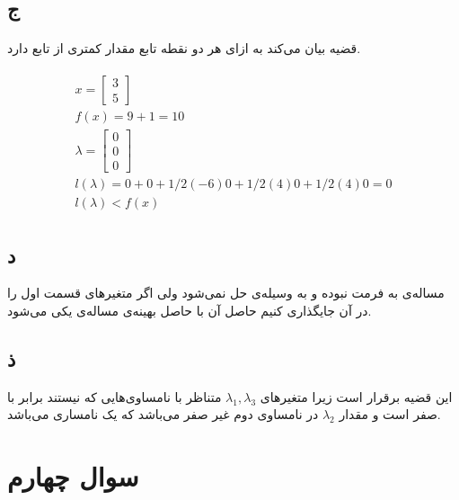 \documentclass[paper=a4, fontsize=11pt]{article}
\numberwithin{equation}{section} %
\numberwithin{figure}{section} %
\numberwithin{table}{section} %
\begin{document}
\subsection{ج}
\paragraph{}
قضیه  بیان می‌کند به ازای هر دو نقطه تابع  مقدار کمتری از تابع  دارد.

\begin{align}
	\begin{split}
		x =
		\left[
		\begin{array}{c}
			3 \\ 5
		\end{array}
		\right]\\
		f(x) = 9 + 1 = 10 \\
		\lambda =
		\left[
		\begin{array}{c}
			0 \\ 0 \\ 0
		\end{array}
		\right]\\
		l(\lambda) = 0 + 0 + 1/2(-6)0 + 1/2(4)0 + 1/2(4)0 = 0 \\
		l(\lambda) < f(x)
	\end{split}
\end{align}

\subsection{د}
مساله‌ی  به فرمت  نبوده و به وسیله‌ی 
حل نمی‌شود ولی اگر متغیرهای قسمت اول را در آن جایگذاری کنیم حاصل آن با
حاصل بهینه‌ی مساله‌ی  یکی می‌شود.

\subsection{ذ}
این قضیه برقرار است زیرا متغیرهای \(\lambda_1, \lambda_3\)
متناظر با نامساوی‌هایی که  نیستند
برابر با صفر است و مقدار \(\lambda_2\)
در نامساوی دوم غیر صفر می‌باشد که یک نامساری  می‌باشد.

\section{سوال چهارم}
\end{document}
